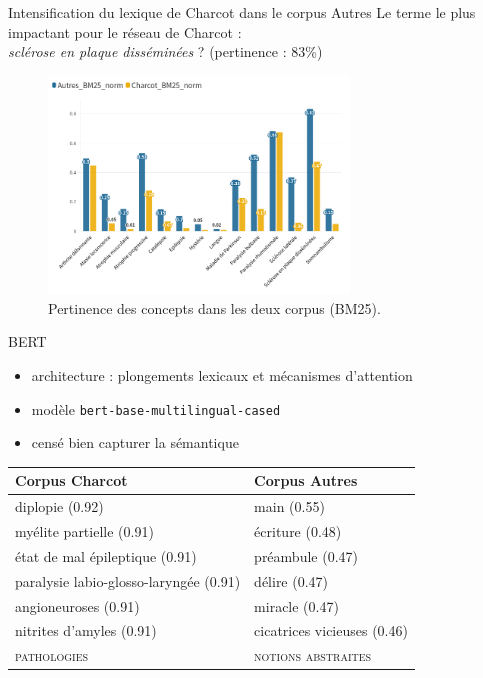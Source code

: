 \begin{frame}{Intensification du lexique
de Charcot dans le corpus \og{}Autres\fg}
Le terme le plus impactant pour le réseau de Charcot :\\ \textit{sclérose en plaque disséminées} ? (pertinence : 83\%)
\begin{figure}[!h]
    \centering
\includegraphics[width=80mm,scale=0.5]{pic/Charcot_Autres_250523.png}
    \caption{Pertinence des concepts dans les deux corpus (BM25).}
    \label{fig:my_label}
\end{figure}
\end{frame}


\begin{frame}{\textsc{BERT}}
\cite{vaswani2021}
    \begin{itemize}
        \item architecture : plongements lexicaux et
mécanismes d’attention
        \item modèle \texttt{bert-base-multilingual-cased}
        \item censé bien capturer la sémantique
    \end{itemize}
\begin{table}[]
\begin{tabular}{ll}
\hline
\rowcolor[HTML]{FFFC9E} 
Corpus \og{}Charcot\fg{}          & \cellcolor[HTML]{ECF4FF}Corpus \og{}Autres\fg{} \\
\hline
diplopie (0.92)                		&  main (0.55) \\
myélite partielle (0.91)               & écriture (0.48)   \\
état de mal épileptique (0.91)       	& préambule (0.47)     \\
paralysie labio-glosso-laryngée (0.91) & délire (0.47)   \\
angioneuroses (0.91)					& miracle (0.47) \\
nitrites d'amyles (0.91)										& cicatrices vicieuses (0.46) \\
\textsc{pathologies} & \textsc{notions abstraites} \\
\hline 
\end{tabular}
\end{table}
\end{frame}

